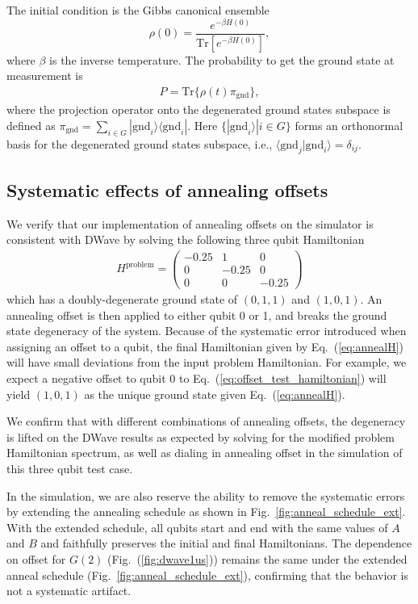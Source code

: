 \documentclass[prd,twocolumn,tightenlines,preprintnumbers,showpacs,superscriptaddress,notitlepage,nofootinbib,eqsecnum,
floatfix,longbibliography,aps,10pt]{revtex4-2}
\begin{document}
The initial condition is the Gibbs canonical ensemble
\begin{equation}
\rho (0) =  \frac{e^{-\beta H(0)}}{\mbox{Tr}[e^{-\beta H(0)}]} ,
\end{equation}
where $\beta$ is the inverse temperature.
The probability to get the ground state at measurement is
\begin{align}
P =  \mbox{Tr} \{  \rho (t) \pi_{\mbox{gnd}} \}  ,
\end{align}
where the projection operator onto the degenerated ground states subspace is defined as $\pi_{\mbox{gnd}}=\sum_{i\in G} |\mbox{gnd}_i\rangle \langle \mbox{gnd}_i| $. Here $\{ | \mbox{gnd}_i \rangle | i \in G \}$ forms an orthonormal basis for the degenerated ground states subspace, i.e., $\langle \mbox{gnd}_j | \mbox{gnd}_i \rangle = \delta_{ij}$.

\subsection{Systematic effects of annealing offsets}
\label{sec:app:offset}
We verify that our implementation of annealing offsets on the simulator is consistent with DWave by solving the following three qubit Hamiltonian
\begin{align}
	\label{eq:offset_test_hamiltonian}
	H^{\textrm{problem}} =
	\begin{pmatrix}
		-0.25 & 1 & 0 \\
		0 & -0.25 & 0 \\
		0 & 0 & -0.25
	\end{pmatrix}
\end{align}
which has a doubly-degenerate ground state of $(0, 1, 1)$ and $(1, 0, 1)$. An annealing offset is then applied to either qubit 0 or 1, and breaks the ground state degeneracy of the system. Because of the systematic error introduced when assigning an offset to a qubit, the final Hamiltonian given by Eq.~(\ref{eq:annealH}) will have small deviations from the input problem Hamiltonian. For example, we expect a negative offset to qubit 0 to Eq.~(\ref{eq:offset_test_hamiltonian}) will yield $(1, 0, 1)$ as the unique ground state given Eq.~(\ref{eq:annealH}).

We confirm that with different combinations of annealing offsets, the degeneracy is lifted on the DWave results as expected by solving for the modified problem Hamiltonian spectrum, as well as dialing in annealing offset in the simulation of this three qubit test case.

In the simulation, we are also reserve the ability to remove the systematic errors by extending the annealing schedule as shown in Fig.~\ref{fig:anneal_schedule_ext}. With the extended schedule, all qubits start and end with the same values of $A$ and $B$ and faithfully preserves the initial and final Hamiltonians. The dependence on offset for $G(2)$ (Fig.~(\ref{fig:dwave1us})) remains the same under the extended anneal schedule (Fig.~\ref{fig:anneal_schedule_ext}), confirming that the behavior is not a systematic artifact.
\end{document}
